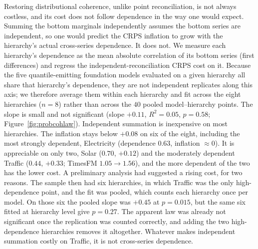 \documentclass[review,number]{elsarticle}
\begin{document}
Restoring distributional coherence, unlike point reconciliation, is not always
costless, and its cost does not follow dependence in the way one would expect. Summing
the bottom marginals independently assumes the bottom series are independent, so one
would predict the CRPS inflation to grow with the hierarchy's actual cross-series
dependence. It does not. We measure each hierarchy's dependence as the mean absolute
correlation of its bottom series (first differences) and regress the
independent-reconciliation CRPS cost on it. Because the five quantile-emitting foundation
models evaluated on a given hierarchy all share that hierarchy's dependence, they are not
independent replicates along this axis; we therefore average them within each hierarchy
and fit across the eight hierarchies ($n=8$) rather than across the $40$ pooled
model--hierarchy points. The slope is small and not significant (slope $+0.11$,
$R^2=0.05$, $p=0.58$; Figure~\ref{fig:probcohlaw}). Independent summation is
inexpensive on most hierarchies. The inflation stays below $+0.08$ on six of the
eight, including the most strongly dependent, Electricity (dependence $0.63$,
inflation $\approx 0$). It is appreciable on only two, Solar ($0.70$, $+0.12$) and
the moderately dependent Traffic ($0.44$, $+0.33$; TimesFM $1.05 \to 1.56$), and the
more dependent of the two has the lower cost. A preliminary analysis had suggested a
rising cost, for two reasons. The sample then had six hierarchies, in which Traffic
was the only high-dependence point, and the fit was pooled, which counts each hierarchy
once per model. On those six the pooled slope was $+0.45$ at $p=0.015$, but the same six
fitted at hierarchy level give $p=0.27$. The apparent law was already not significant
once the replication was counted correctly, and adding the two high-dependence
hierarchies removes it altogether. Whatever makes independent summation costly on
Traffic, it is not cross-series dependence.
\end{document}
